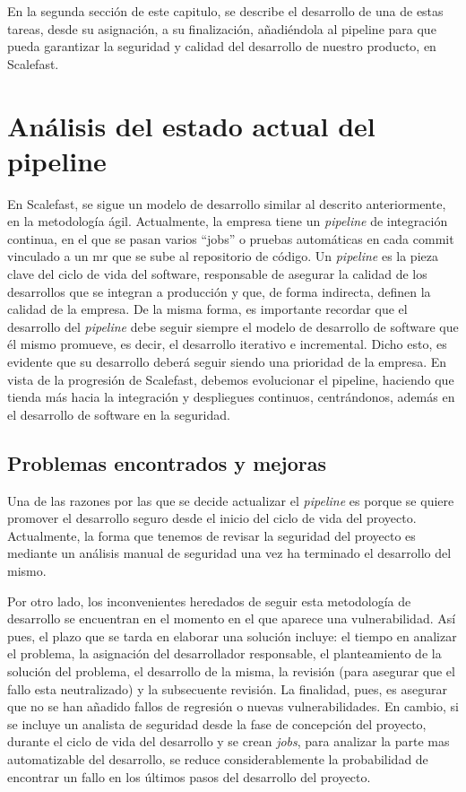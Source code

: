 \documentclass[12pt]{report} %
\begin{document}
En la segunda sección de este capitulo, se describe el desarrollo de una de
estas tareas, desde su asignación, a su finalización, añadiéndola al
\gls{pipeline} para que pueda garantizar la seguridad y calidad del desarrollo
de nuestro producto, en Scalefast.

\section{Análisis del estado actual del pipeline} %

En Scalefast, se sigue un modelo de desarrollo similar al descrito
anteriormente, en la metodología ágil.  Actualmente, la empresa tiene un
\textit{\gls{pipeline}} de integración continua, en el que se pasan varios
``jobs'' o pruebas automáticas en cada commit vinculado a un \acrfull{mr} que se
sube al repositorio de código.  Un \textit{\gls{pipeline}} es la pieza clave del
ciclo de vida del software, responsable de asegurar la calidad de los
desarrollos que se integran a producción y que, de forma indirecta,
definen la calidad de la empresa.  De la misma forma, es importante recordar que el
desarrollo del \textit{\gls{pipeline}} debe seguir siempre el modelo de
desarrollo de software que él mismo promueve, es decir, el desarrollo iterativo e
incremental.  Dicho esto, es evidente que su desarrollo deberá seguir
siendo una prioridad de la empresa.  En vista de la progresión de Scalefast,
debemos evolucionar el pipeline, haciendo que tienda más hacia la integración y
despliegues continuos, centrándonos, además en el desarrollo de software en la
seguridad.  

\subsection{Problemas encontrados y mejoras}

Una de las razones por las que se decide actualizar el \textit{\gls{pipeline}}
es porque se quiere promover el desarrollo seguro desde el inicio del ciclo de
vida del proyecto.  Actualmente, la forma que tenemos de revisar la seguridad
del proyecto es mediante un análisis manual de seguridad una vez ha
terminado el desarrollo del mismo.  

Por otro lado, los inconvenientes heredados de seguir
esta metodología de desarrollo se encuentran en el momento en el que aparece una vulnerabilidad. Así pues, el plazo que se tarda en elaborar una solución
incluye: el tiempo en analizar el problema, la asignación del
desarrollador responsable, el
planteamiento de la solución del problema, el desarrollo de la misma, la
revisión (para asegurar que el fallo esta neutralizado) y la subsecuente revisión. La finalidad, pues, es asegurar que no se han añadido fallos de regresión o nuevas
vulnerabilidades.  
En cambio, si se incluye un analista de seguridad desde la
fase de concepción del proyecto, durante el ciclo de vida del desarrollo y se crean \textit{\gls{job}s}, para analizar la parte mas automatizable
del desarrollo, se reduce considerablemente la probabilidad de
encontrar un fallo en los últimos pasos del desarrollo del proyecto.
\end{document}
